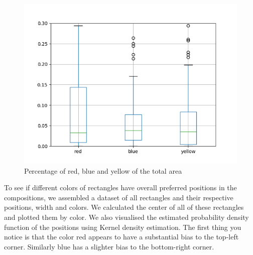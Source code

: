 \begin{figure}
  \includegraphics[width=\linewidth]{images/colors-rby.png}
  \caption{Percentage of red, blue and yellow of the total area}
  \label{fig:colors-rby}
\end{figure}

To see if different colors of rectangles have overall preferred positions in the
compositions, we assembled a dataset of all rectangles and their respective
positions, width and colors. We calculated the center of all of these rectangles
and plotted them by color. We also visualised the estimated probability density
function of the positions using Kernel density estimation. The first thing you
notice is that the color red appears to have a substantial bias to the top-left
corner. Similarly blue has a slighter bias to the bottom-right corner.

